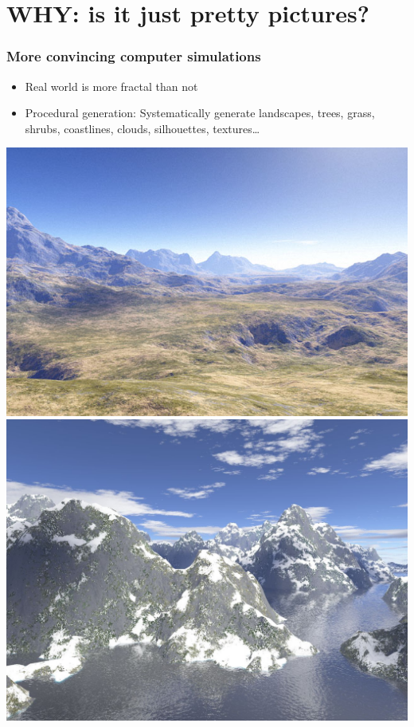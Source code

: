 \documentclass[12pt]{beamer}
\begin{document}
\section{WHY: is it just pretty pictures?}
\begin{frame}
\frametitle{More convincing computer simulations}
\begin{itemize}[<+->]
	\item Real world is more fractal than not
	\item \alert{Procedural generation}: Systematically generate landscapes, trees, grass, shrubs, coastlines, clouds, silhouettes, textures\dots
\end{itemize}
\pause[\thebeamerpauses]
\hfill
	\includegraphics[height=0.25\paperheight]{../media/FractalLandscape}%
	\includegraphics[height=0.25\paperheight]{../media/Fractal_terrain_texture}%

\end{frame}
\end{document}
